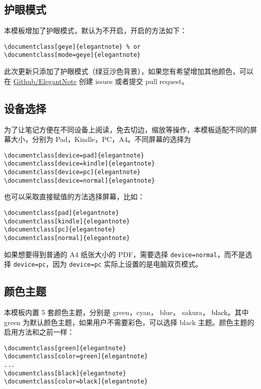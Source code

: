 \documentclass[cn,pad,11pt,green,geye]{../elegantnote}
\begin{document}
\subsection{护眼模式}
本模板增加了护眼模式，默认为不开启，开启的方法如下：
\begin{lstlisting}[frame=none]  
\documentclass[geye]{elegantnote} % or
\documentclass[mode=geye]{elegantnote}
\end{lstlisting}

\begin{remark}
此次更新只添加了护眼模式（绿豆沙色背景），如果您有希望增加其他颜色，可以在 \href{https://github.com/ElegantLaTeX/ElegantNote}{Github/ElegantNote} 创建 issues 或者提交 pull request。
\end{remark}

\subsection{设备选择}
为了让笔记方便在不同设备上阅读，免去切边，缩放等操作，本模板适配不同的屏幕大小，分别为 Pad，Kindle，PC，A4。不同屏幕的选择为
\begin{lstlisting}[frame=none]  
\documentclass[device=pad]{elegantnote}
\documentclass[device=kindle]{elegantnote}
\documentclass[device=pc]{elegantnote}
\documentclass[device=normal]{elegantnote}
\end{lstlisting}
\begin{note}
也可以采取直接赋值的方法选择屏幕，比如：
\end{note}
\begin{lstlisting}[frame=none]  
\documentclass[pad]{elegantnote}
\documentclass[kindle]{elegantnote}
\documentclass[pc]{elegantnote}
\documentclass[normal]{elegantnote}
\end{lstlisting}

\begin{note}
如果想要得到普通的 A4 纸张大小的 PDF，需要选择 \lstinline{device=normal}，而不是选择 \lstinline{device=pc}，因为  \lstinline{device=pc} 实际上设置的是电脑双页模式。
\end{note}

\subsection{颜色主题}
本模板内置 5 套颜色主题，分别是 \textcolor{egreen}{green}，\textcolor{ecyan}{cyan}， \textcolor{eblue}{blue}， \textcolor{sakura}{sakura}， \textcolor{black}{black}。其中 green 为默认颜色主题，如果用户不需要彩色，可以选择 black 主题。颜色主题的启用方法和之前一样：
\begin{lstlisting}[frame=none]  
\documentclass[green]{elegantnote}
\documentclass[color=green]{elegantnote}
...
\documentclass[black]{elegantnote}
\documentclass[color=black]{elegantnote}
\end{lstlisting}
\end{document}
